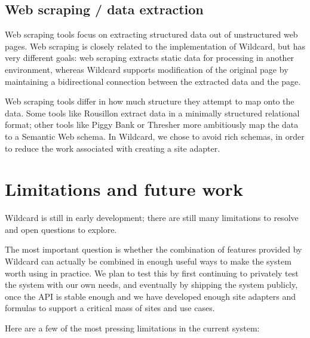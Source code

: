 \documentclass[english,submission]{programming}
\begin{document}
\hypertarget{web-scraping-data-extraction}{%
\subsection{Web scraping / data
extraction}\label{web-scraping-data-extraction}}

Web scraping tools focus on extracting structured data out of
unstructured web pages. Web scraping is closely related to the
implementation of Wildcard, but has very different goals: web scraping
extracts static data for processing in another environment, whereas
Wildcard supports modification of the original page by maintaining a
bidirectional connection between the extracted data and the page.

Web scraping tools differ in how much structure they attempt to map onto
the data. Some tools like Rousillon \autocite{chasins2018} extract data
in a minimally structured relational format; other tools like Piggy Bank
\autocite{huynh2005} or Thresher \autocite{hogue2005} more ambitiously
map the data to a Semantic Web schema. In Wildcard, we chose to avoid
rich schemas, in order to reduce the work associated with creating a
site adapter.

\hypertarget{limitations-and-future-work}{%
\section{Limitations and future
work}\label{limitations-and-future-work}}

Wildcard is still in early development; there are still many limitations
to resolve and open questions to explore.

The most important question is whether the combination of features
provided by Wildcard can actually be combined in enough useful ways to
make the system worth using in practice. We plan to test this by first
continuing to privately test the system with our own needs, and
eventually by shipping the system publicly, once the API is stable
enough and we have developed enough site adapters and formulas to
support a critical mass of sites and use cases.

Here are a few of the most pressing limitations in the current system:
\end{document}
